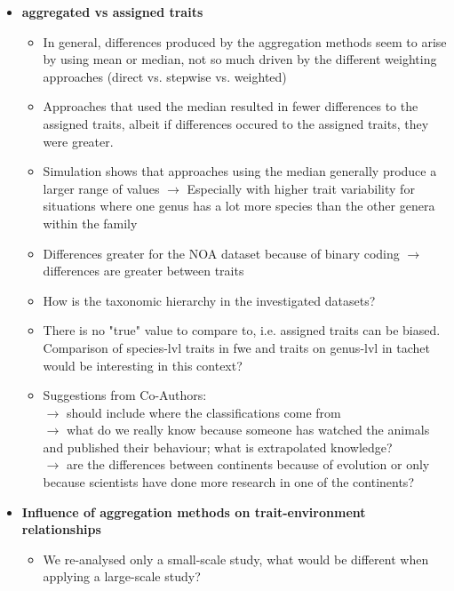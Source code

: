 \documentclass{article}
\begin{document}
\begin{itemize}
  \item \textbf{aggregated vs assigned traits}
  \begin{itemize}
    \item In general, differences produced by the aggregation methods seem to arise by using mean or median, not so much driven by the different weighting approaches (direct vs. stepwise vs. weighted)
    \item Approaches that used the median resulted in fewer differences to the assigned traits, albeit if differences occured to the assigned traits, they were greater. 
    \item Simulation shows that approaches using the median generally produce a larger range of values $\rightarrow$ Especially with higher trait variability for situations where one genus has a lot more species than the other genera within the family 
    \item Differences greater for the NOA dataset because of binary coding $\rightarrow$ differences are greater between traits
    \item How is the taxonomic hierarchy in the investigated datasets? 
    \item There is no "true" value to compare to, i.e. assigned traits can be biased. Comparison of species-lvl traits in fwe and traits on genus-lvl in tachet would be interesting in this context? 
    \item  Suggestions from Co-Authors: \\
     $\rightarrow$ should include where the classifications come from \\
     $\rightarrow$ what do we really know because someone has watched the animals and published their behaviour; what is extrapolated knowledge? \\
     $\rightarrow$ are the differences between continents because of evolution or only because scientists have done more research in one of the continents?
  \end{itemize}
  \item \textbf{Influence of aggregation methods on trait-environment relationships}
  \begin{itemize}
    \item We re-analysed only a small-scale study, what would be different when applying a large-scale study?
  \end{itemize}
\end{itemize}
\end{document}
